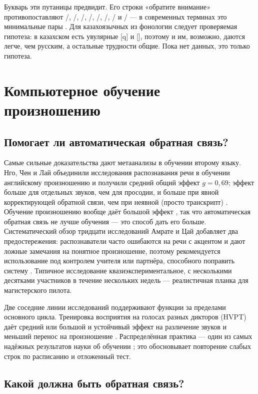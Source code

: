 \documentclass[a4paper,14pt]{extarticle}
\begin{document}
Букварь эти путаницы предвидит. Его строки «обратите внимание» противопоставляют /,
/, /, /, /, /, / и
/ --- в современных терминах это минимальные пары \cite{SRC-040}. Для казахоязычных из
фонологии следует проверяемая гипотеза: в казахском есть увулярные [q] и [], поэтому  и
 им, возможно, даются легче, чем русским, а остальные трудности общие. Пока нет данных, это
только гипотеза.

\section{Компьютерное обучение произношению}

\subsection{Помогает ли автоматическая обратная связь?}

Самые сильные доказательства дают метаанализы в обучении второму языку. Нго, Чен и Лай объединили
исследования распознавания речи в обучении английскому произношению и получили средний общий эффект
$g = 0{,}69$; эффект больше для отдельных звуков, чем для просодии, и больше при явной корректирующей
обратной связи, чем при неявной (просто транскрипт) \cite{SRC-025}. Обучение произношению вообще даёт
большой эффект \cite{SRC-105}, так что автоматическая обратная связь не лучше обучения --- это способ
дать его больше. Систематический обзор тридцати исследований Амрате и Цай добавляет два
предостережения: распознаватели часто ошибаются на речи с акцентом и дают ложные замечания на понятное
произношение, поэтому рекомендуется использование под контролем учителя или партнёра, способного
поправить систему \cite{SRC-026}. Типичное исследование квазиэкспериментальное, с несколькими
десятками участников в течение нескольких недель --- реалистичная планка для магистерского пилота.

Две соседние линии исследований поддерживают функции за пределами основного цикла. Тренировка
восприятия на голосах разных дикторов (HVPT) даёт средний или большой и устойчивый эффект на
различение звуков \cite{SRC-044} и меньший перенос на произношение \cite{SRC-045}. Распределённая
практика --- один из самых надёжных результатов науки об обучении \cite{SRC-107}; это обосновывает
повторение слабых строк по расписанию и отложенный тест.

\subsection{Какой должна быть обратная связь?}
\end{document}
